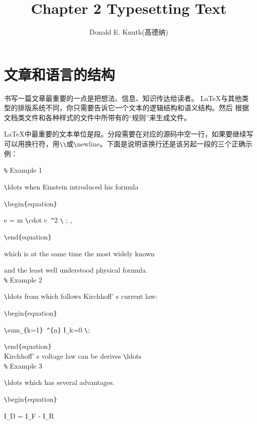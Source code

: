 \documentclass[UTF8]{ctexart}
\title{\heiti Chapter 2 Typesetting Text}
\author{ Donald E. Knuth(高德纳)}
\begin{document}
\maketitle
\section{文章和语言的结构}
书写一篇文章最重要的一点是把想法、信息、知识传达给读者。 \LaTeX 与其他类型的排版系统不同，你只需要告诉它一个文本的逻辑结构和语义结构。然后
根据文档类文件和各种样式的文件中所带有的“规则”来生成文件。

\LaTeX 中最重要的文本单位是段。分段需要在对应的源码中空一行，如果要继续写可以用换行符，用\texttt{\textbackslash}\texttt{\textbackslash}或\texttt{\textbackslash}newline。下面是说明该换行还是该另起一段的三个正确示例：

\texttt{\%} Example 1

\texttt{\textbackslash}ldots when Einstein introduced his formula

\texttt{\textbackslash}begin\texttt{\{}equation\texttt{\}}

   \qquad e = m \texttt{\textbackslash}cdot c\texttt{~\^}2 \texttt{\textbackslash} ; ,

\texttt{\textbackslash}end\texttt{\{}equation\texttt{\}}

which is at the same time the most widely known

and the least well understood physical formula.
\\

\texttt{\%} Example 2

\texttt{\textbackslash}ldots from which follows Kirchhoff' s current law:

\texttt{\textbackslash}begin\texttt{\{}equation\texttt{\}}

  \qquad \texttt{\textbackslash}sum\texttt{\_}\texttt{\{}k=1\texttt{\}}\texttt{~\^}\texttt{\{}n\texttt{\}}  I\texttt{\_}k=0 \texttt{\textbackslash};

\texttt{\textbackslash}end\texttt{\{}equation\texttt{\}}
\\

Kirchhoff' s voltage law can be derives \texttt{\textbackslash}ldots
\\

\texttt{\%} Example 3

\texttt{\textbackslash}ldots which has several advantages.

\texttt{\textbackslash}begin\texttt{\{}equation\texttt{\}}

   \qquad I\texttt{\_}D = I\texttt{\_}F - I\texttt{\_}R
\end{document}
